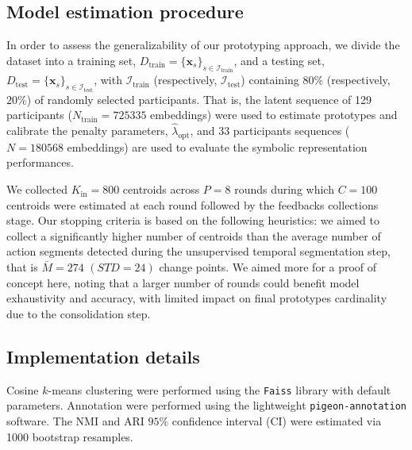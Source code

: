     \subsection{Model estimation procedure}

        In order to assess the generalizability of our prototyping approach, we divide the dataset into a training set, $D_{\text{train}} = \{ \textbf{x}_s  \}_{s \in \mathcal{I}_{\text{train}}}$, and a testing set, $D_{\text{test}} = \{ \textbf{x}_s  \}_{s \in \mathcal{I}_{\text{test}}}$, with $\mathcal{I}_{\text{train}}$ (respectively, $\mathcal{I}_{\text{test}}$) containing $80\%$ (respectively, $20\%$) of randomly selected participants. That is, the latent sequence of 129 participants ($N_{\text{train}}=725335$ embeddings) were used to estimate prototypes and calibrate the penalty parameters, $\hat{\lambda}_{\text{opt}}$, and 33 participants sequences ($N=180568$ embeddings) are used to evaluate the symbolic representation performances. 

        We collected $K_\text{in}=800$ centroids across $P=8$ rounds during which $C=100$ centroids were estimated at each round followed by the feedbacks collections stage. Our stopping criteria is based on the following heuristics: we aimed to collect a significantly higher number of centroids than the average number of action segments detected during the unsupervised temporal segmentation step, that is $\bar{M}=274$ $(STD=24)$ change points. We aimed more for a proof of concept here, noting that a larger number of rounds could benefit model exhaustivity and accuracy, with limited impact on final prototypes cardinality due to the consolidation step. 

    \subsection{Implementation details}

        Cosine $k$-means clustering were performed using the \texttt{Faiss} library \cite{douze2024faiss} with default parameters. Annotation were performed using the lightweight \texttt{pigeon-annotation} software\footnotemark[1]. The NMI and ARI  $95\%$ confidence interval (CI) were estimated via 1000 bootstrap resamples. %

